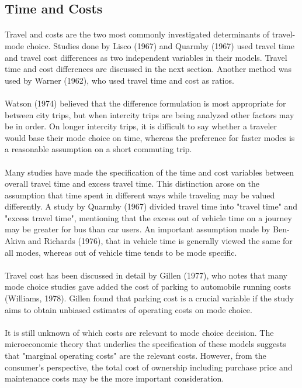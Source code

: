 \subsection{Time and Costs}
\paragraph{}Travel and costs are the two most commonly investigated determinants of travel-mode choice. Studies done by Lisco (1967) and Quarmby (1967) used travel time and travel cost differences as two independent variables in their models. Travel time and cost differences are discussed in the next section. Another method was used by Warner (1962), who used travel time and cost as ratios.
\paragraph{}Watson (1974) believed that the difference formulation is most appropriate for between city trips, but when intercity trips are being analyzed other factors may be in order. On longer intercity trips, it is difficult to say whether a traveler would base their mode choice on time, whereas the preference for faster modes is a reasonable assumption on a short commuting trip. 
\paragraph{}Many studies have made the specification of the time and cost variables between overall travel time and excess travel time. This distinction arose on the assumption that time spent in different ways while traveling may be valued differently. A study by Quarmby (1967) divided travel time into "travel time" and "excess travel time", mentioning that the excess out of vehicle time on a journey may be greater for bus than car users. An important assumption made by Ben-Akiva and Richards (1976), that in vehicle time is generally viewed the same for all modes, whereas out of vehicle time tends to be mode  specific. 
\paragraph{}Travel cost has been discussed in detail by Gillen (1977), who notes that many mode choice studies gave added the cost of parking to automobile running costs (Williams, 1978). Gillen found that parking cost is a  crucial variable if the study aims to obtain unbiased estimates of operating costs on mode choice. 
\paragraph{}It is still unknown of which costs are relevant to mode choice decision. The microeconomic theory that underlies the specification of these models suggests that "marginal operating costs" are the relevant costs. However, from the consumer's perspective, the total cost of ownership including purchase price and maintenance costs may be the more important consideration.  
